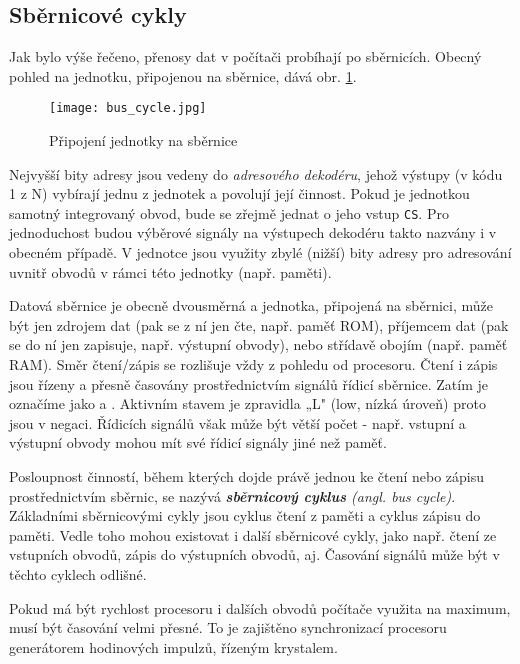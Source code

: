     \subsection{Sběrnicové cykly}\label{ces:IchapIVsecIssecI}
      Jak bylo výše řečeno, přenosy dat v počítači probíhají po sběrnicích. Obecný pohled na 
      jednotku, připojenou na sběrnice, dává obr. \ref{MIT:fig_bus_cycle}.
      
      \begin{figure}[ht!] %
        \centering
        \texttt{[image: bus\_cycle.jpg]}
        \caption{ Připojení jednotky na sběrnice}
        \label{MIT:fig_bus_cycle}
      \end{figure}
      Nejvyšší bity adresy jsou vedeny do \emph{adresového dekodéru}, jehož výstupy (v kódu 1 z N) 
      vybírají jednu z jednotek a povolují její činnost. Pokud je jednotkou samotný integrovaný 
      obvod, bude se zřejmě jednat o jeho vstup \texttt{CS}. Pro jednoduchost budou výběrové 
      signály na výstupech dekodéru takto nazvány i v obecném případě. V jednotce jsou využity 
      zbylé (nižší) bity adresy pro adresování uvnitř obvodů v rámci této jednotky (např. paměti).
      
      Datová sběrnice je obecně dvousměrná a jednotka, připojená na sběrnici, může být jen zdrojem 
      dat (pak se z ní jen čte, např. paměť ROM), příjemcem dat (pak se do ní jen zapisuje, např. 
      výstupní obvody), nebo střídavě obojím (např. paměť RAM). Směr čtení/zápis se rozlišuje vždy 
      z pohledu od procesoru. Čtení i zápis jsou řízeny a přesně časovány prostřednictvím signálů 
      řídicí sběrnice. Zatím je označíme jako  a . Aktivním stavem je 
      zpravidla „L" (low, nízká úroveň) proto jsou v negaci. Řídicích signálů však může být větší 
      počet - např. vstupní a výstupní obvody mohou mít své řídicí signály jiné než paměť.
      
      Posloupnost činností, během kterých dojde právě jednou ke čtení nebo zápisu prostřednictvím 
      sběrnic, se nazývá \emph{\textbf{sběrnicový cyklus} (angl. bus cycle)}. Základními 
      sběrnicovými cykly jsou cyklus čtení z paměti a cyklus zápisu do paměti. Vedle toho mohou 
      existovat i další sběrnicové cykly, jako např. čtení ze vstupních obvodů, zápis do výstupních 
      obvodů, aj. Časování signálů může být v těchto cyklech odlišné.
      
      Pokud má být rychlost procesoru i dalších obvodů počítače využita na maximum, musí být 
      časování velmi přesné. To je zajištěno synchronizací procesoru generátorem hodinových 
      impulzů, řízeným krystalem.

